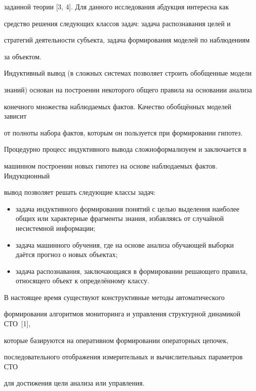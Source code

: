заданной теории [3, 4]. Для данного исследования абдукция интересна как

средство решения следующих классов задач: задача распознавания целей и

стратегий деятельности субъекта, задача формирования моделей по наблюдениям

за объектом.



Индуктивный вывод (в сложных системах позволяет строить обобщенные модели

знаний) основан на построении некоторого общего правила на основании анализа

конечного множества наблюдаемых фактов. Качество обобщённых моделей зависит

от полноты набора фактов, которым он пользуется при формировании гипотез.

Процедурно процесс индуктивного вывода сложноформализуем и заключается в

машинном построении новых гипотез на основе наблюдаемых фактов. Индукционный

вывод позволяет решать следующие классы задач:

\begin{itemize}

\item задача индуктивного формирования понятий с целью выделения наиболее общих или характерные фрагменты знания, избавляясь от случайной несистемной информации;

\item задача машинного обучения, где на основе анализа обучающей выборки даётся прогноз о новых объектах;

\item задача распознавания, заключающаяся в формировании решающего правила, относящего объект к определённому классу.

\end{itemize}



В настоящее время существуют конструктивные методы автоматического

формирования алгоритмов мониторинга и управления структурной динамикой СТО~[1],

которые базируются на оперативном формировании операторных цепочек,

последовательного отображения измерительных и вычислительных параметров СТО

для достижения цели анализа или управления.

